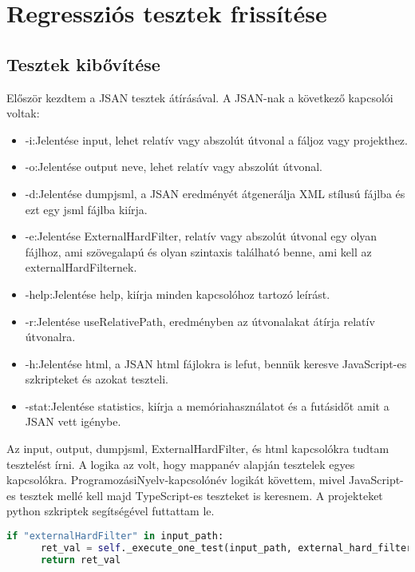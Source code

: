\chapter{Regressziós tesztek frissítése}\label{chap:Regteszt_frissítés}

\section{Tesztek kibővítése}

\noindent

Először kezdtem a JSAN tesztek átírásával. A JSAN-nak a következő kapcsolói voltak:
\begin{itemize}
      \item -i:Jelentése input, lehet relatív vagy abszolút útvonal a fáljoz vagy projekthez.
      \item -o:Jelentése output neve, lehet relatív vagy abszolút útvonal.
      \item -d:Jelentése dumpjsml, a JSAN eredményét átgenerálja XML stílusú fájlba és ezt egy jsml fájlba kiírja.
      \item -e:Jelentése ExternalHardFilter, relatív vagy abszolút útvonal egy olyan fájlhoz, ami szövegalapú és olyan szintaxis található benne, ami kell az externalHardFilternek.
      \item -help:Jelentése help, kiírja minden kapcsolóhoz tartozó leírást.
      \item -r:Jelentése useRelativePath, eredményben az útvonalakat átírja relatív útvonalra.
      \item -h:Jelentése html, a JSAN html fájlokra is lefut, bennük keresve JavaScript-es szkripteket és azokat teszteli.
      \item -stat:Jelentése statistics, kiírja a memóriahasználatot és a futásidőt amit a JSAN vett igénybe.
\end{itemize}

\noindent

Az input, output, dumpjsml, ExternalHardFilter, és html kapcsolókra tudtam tesztelést írni. A logika az volt, hogy mappanév alapján tesztelek egyes kapcsolókra.
ProgramozásiNyelv-kapcsolónév logikát követtem, mivel JavaScript-es tesztek mellé kell majd TypeScript-es teszteket is keresnem.
A projekteket python szkriptek segítségével futtattam le.

\begin{lstlisting}[caption={JSAN kapcsoló vizsgálat pythonban}, label={lst:python_kapcsolo}, language={Python}]
if "externalHardFilter" in input_path:
      ret_val = self._execute_one_test(input_path, external_hard_filter=True) and ret_val
      return ret_val
\end{lstlisting}

